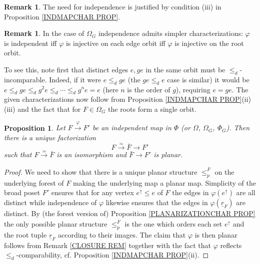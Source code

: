 \documentclass[a4paper,10pt
,draft
]{article}%
\numberwithin{equation}{section}
\numberwithin{figure}{section}
\newtheorem{proposition}[equation]{Proposition}%
\theoremstyle{definition} %
\newtheorem{remark}[equation]{Remark}%
\newcommand{\1}{\ensuremath{\mathbbm 1}}%
\begin{document}
\begin{remark}
The need for independence is justified by
condition (iii) in Proposition \ref{INDMAPCHAR PROP}.
\end{remark}


\begin{remark}\label{INDOMGALT REM}
In the case of $\Omega_G$
independence admits simpler characterizations:
$\varphi$ is independent iff $\varphi$ is injective on each edge orbit iff $\varphi$ is injective on the root orbit.

To see this, note first that distinct edges $e, g e$ in the same orbit must be $\leq_d$-incomparable.
Indeed, if it were 
$e \leq_d g e$ (the $g e \leq_d e$ case is similar)
it would be
$e \leq_d g e \leq_d g^2 e \leq_d \cdots
\leq_d g^n e = e$ (here $n$ is the order of $g$),
requiring $e=ge$.
The given characterizations now follow from
Proposition \ref{INDMAPCHAR PROP}(ii)(iii)
and the fact that for $F \in \Omega_G$ the roots form a single orbit.
\end{remark}


\begin{proposition}
\label{PLANARPULL PROP}
	Let $F \xrightarrow{\varphi} F'$ be an independent map in $\Phi$ (or $\Omega$, $\Omega_G$, $\Phi_G$). Then there is a unique factorization 
	\[F \xrightarrow{\simeq} \bar{F} \to F'\]
	such that $F \xrightarrow{\simeq} \bar{F}$ is an isomorphism and $\bar{F} \to F'$ is planar.
\end{proposition}

\begin{proof}
We need to show that there is a unique planar structure 
$\leq_p^{\bar{F}}$ on the underlying forest of $F$ making the underlying map a planar map.
Simplicity of the broad poset $F'$ ensures that for any vertex $e^{\uparrow} \leq e$ of $F$ the edges in $\varphi(e^{\uparrow})$ are all distinct while independence of $\varphi$ likewise ensures that the edges in $\varphi(\underline{r}_F)$ are distinct.
By (the forest version of) Proposition
\ref{PLANARIZATIONCHAR PROP}
the only possible planar structure $\leq_p^{\bar{F}}$
is the one which orders each set $e^{\uparrow}$ and the root tuple $\underline{r}_F$ according to their images.
The claim that $\varphi$ is then planar follows from 
Remark \ref{CLOSURE REM}
together with the
fact that $\varphi$ reflects $\leq_d$-comparability,
cf. Proposition \ref{INDMAPCHAR PROP}(ii).
\end{proof}
\end{document}
